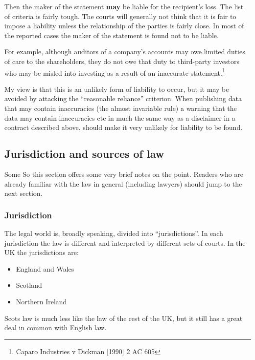 Then the maker of the statement \textbf{may} be liable for the
recipient's loss. The list of criteria is fairly tough. The courts will
generally not think that it is fair to impose a liability unless the
relationship of the parties is fairly close. In most of the reported
cases the maker of the statement is found not to be liable.

For example, although auditors of a company's accounts may owe limited
duties of care to the shareholders, they do not owe that duty to
third-party investors who may be misled into investing as a result of an
inaccurate statement.\footnote{Caparo Industries v Dickman {[}1990{]} 2
  AC 605}

My view is that this is an unlikely form of liability to occur, but it
may be avoided by attacking the ``reasonable reliance'' criterion. When
publishing data that may contain inaccuracies (the almost invariable
rule) a warning that the data may contain inaccuracies etc in much the
same way as a disclaimer in a contract described above, should make it
very unlikely for liability to be found.

\subsection{Jurisdiction and sources of
law}\label{jurisdiction-and-sources-of-law}

Some So this section offers some very brief notes on the point. Readers
who are already familiar with the law in general (including lawyers)
should jump to the next section.

\subsubsection{Jurisdiction}\label{jurisdiction}

The legal world is, broadly speaking, divided into ``jurisdictions''. In
each jurisdiction the law is different and interpreted by different sets
of courts. In the UK the jurisdictions are:

\begin{itemize}
\item
  England and Wales
\item
  Scotland
\item
  Northern Ireland
\end{itemize}

Scots law is much less like the law of the rest of the UK, but it still
has a great deal in common with English law.

